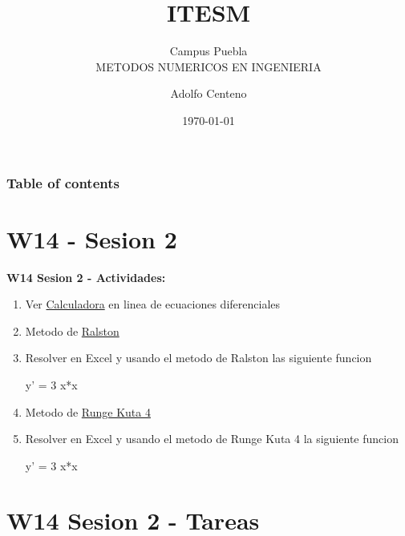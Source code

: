 \documentclass{beamer}
\begin{document}
\title{ITESM}  
\subtitle{Campus Puebla\\METODOS NUMERICOS EN INGENIERIA
}
\author{Adolfo Centeno}
\date{\today} 


\begin{frame}
\titlepage
\end{frame}

\begin{frame}\frametitle{Table of contents}
\tableofcontents
\end{frame} 


\section{W14 - Sesion 2 }

\begin{frame}

\textbf{W14 Sesion 2 - Actividades:}

\begin{enumerate}

\item
    Ver \href{https://es.symbolab.com/solver/ordinary-differential-equation-calculator}{Calculadora} en linea de ecuaciones diferenciales

\item
	Metodo de \href{https://gomez-metodos-numericos.webnode.es/ecuaciones-diferenciales-ordinarias/ralston/}{Ralston}

\item Resolver en Excel y usando el metodo de Ralston las siguiente funcion

y' =  3 x*x


\item
	Metodo de \href{https://www.youtube.com/watch?v=YCLUN-2EQB8}{Runge Kuta 4}

\item Resolver en Excel y usando el metodo de Runge Kuta 4 la siguiente funcion

y'  =  3 x*x 



\end{enumerate} 

\end{frame}


\section{W14 Sesion 2 - Tareas }
\end{document}
